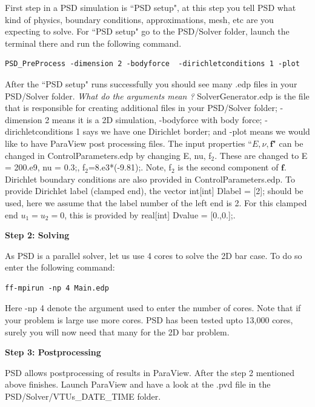 \documentclass{report}
\begin{document}
First step in a PSD simulation is ``PSD setup", at this step you tell PSD what kind of physics, boundary conditions, approximations, mesh, etc are you expecting to solve.
For ``PSD setup" go to the {\ttfamily PSD/Solver} folder, launch the terminal there and run the following command.
\begin{lstlisting}[style=Linux]
PSD_PreProcess -dimension 2 -bodyforce  -dirichletconditions 1 -plot
\end{lstlisting}
%
After the ``PSD setup" runs successfully you should see many {\ttfamily .edp} files in your {\ttfamily PSD/Solver} folder. \textit{What do the arguments mean ?} {\ttfamily SolverGenerator.edp} is the file that is responsible for creating additional files in your {\ttfamily PSD/Solver} folder; {\ttfamily -dimension 2} means it is a 2D simulation, {\ttfamily -bodyforce} with body force; {\ttfamily -dirichletconditions 1} says we have one Dirichlet border; and {\ttfamily -plot} means we would like to have ParaView post processing files. The input properties ``$E,\nu, \mathbf{f}$" can be changed in {\ttfamily ControlParameters.edp} by changing {\ttfamily E, nu, f$_2$}. These are changed to {\ttfamily E  = 200.e9}, {\ttfamily nu = 0.3;}, {\ttfamily f$_2$=8.e3*(-9.81);}. Note, {\ttfamily f$_2$} is the second component of $\mathbf{f}$. Dirichlet boundary conditions are also provided in {\ttfamily ControlParameters.edp}. To provide Dirichlet label (clamped end), the vector {\ttfamily int[int] Dlabel = [2];} should be used, here we assume that the label number of the left end is 2. For this clamped end $u_1=u_2=0$, this is provided by {\ttfamily real[int]   Dvalue = [0.,0.];}.

\textbf{Step 2: Solving}

As PSD is a parallel solver, let us use  4 cores to solve the 2D bar case. To do so enter the following command:

\begin{lstlisting}[style=Linux]
ff-mpirun -np 4 Main.edp
\end{lstlisting}

Here {\ttfamily -np 4} denote the argument used to enter the number of cores. Note that if your problem is large use more cores. PSD has been tested upto 13,000 cores, surely you will now need that many for the 2D bar problem. 

\textbf{Step 3: Postprocessing}

PSD allows postprocessing of results in ParaView. After the step 2 mentioned above finishes. Launch ParaView and have a look at the  {\ttfamily .pvd} file in the  {\ttfamily PSD/Solver/VTUs\_DATE\_TIME} folder. 
\end{document}
